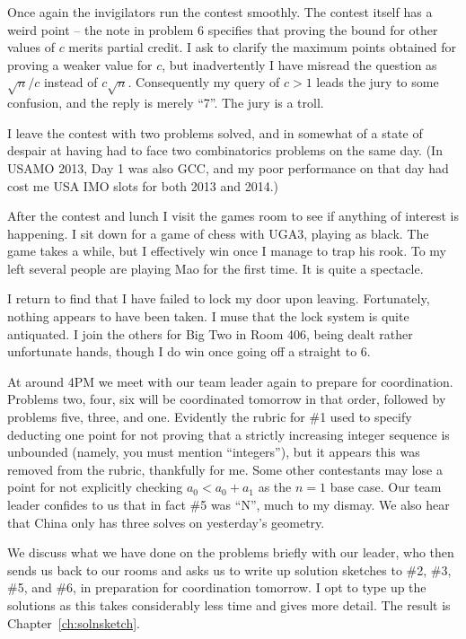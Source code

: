 \documentclass[11pt]{scrreprt}
\numberwithin{figure}{chapter}
\begin{document}
Once again the invigilators run the contest smoothly.
The contest itself has a weird point -- the note in problem 6 specifies that proving the bound for other values of $c$
merits partial credit. I ask to clarify the maximum points obtained for proving a weaker value for $c$, but inadvertently
I have misread the question as $\sqrt n / c$ instead of $c \sqrt n$. Consequently my query of $c > 1$ leads the jury
to some confusion, and the reply is merely ``7''. The jury is a troll.

I leave the contest with two problems solved, and in somewhat of a state of despair at having
had to face two combinatorics problems on the same day.
(In USAMO 2013, Day 1 was also GCC, and my poor performance on that day had cost me USA IMO slots for both 2013 and 2014.)

After the contest and lunch I visit the games room to see if anything of interest is happening.
I sit down for a game of chess with UGA3, playing as black.
The game takes a while, but I effectively win once I manage to trap
his rook. To my left several people are playing Mao for the first time.
It is quite a spectacle.

I return to find that I have failed to lock my door upon leaving. Fortunately, nothing appears to
have been taken. I muse that the lock system is quite antiquated.
I join the others for Big Two in Room 406, being dealt rather unfortunate hands, though
I do win once going off a straight to 6.

At around 4PM we meet with our team leader again to prepare for coordination.
Problems two, four, six will be coordinated tomorrow in that order, followed by problems five, three, and one.
Evidently the rubric for \#1 used to specify deducting one point for not proving that a strictly increasing
integer sequence is unbounded (namely, you must mention ``integers''), but it appears this was removed
from the rubric, thankfully for me.
Some other contestants may lose a point for not explicitly checking $a_0 < a_0 + a_1$ as the $n=1$ base case.
Our team leader confides to us that in fact \#5 was ``N'', much to my dismay.
We also hear that China only has three solves on yesterday's geometry.

We discuss what we have done on the problems briefly with our leader, who then sends us back to our
rooms and asks us to write up solution sketches to \#2, \#3, \#5, and \#6, in preparation for coordination tomorrow.
I opt to type up the solutions as this takes considerably less time and gives more detail.
The result is Chapter~\ref{ch:solnsketch}.
\end{document}
